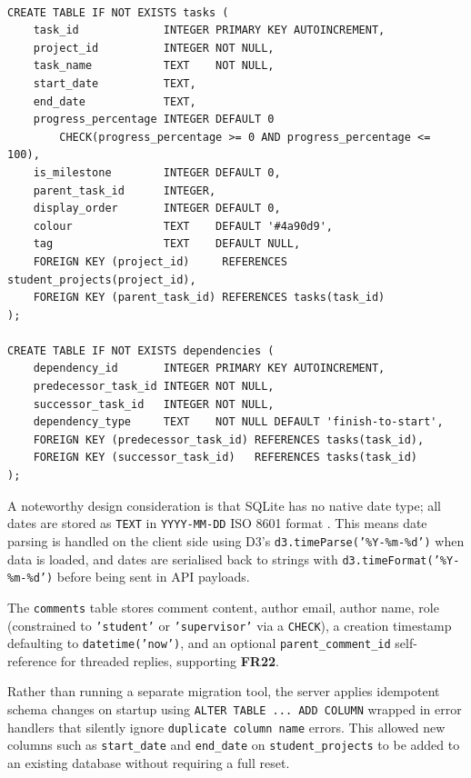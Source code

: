 \documentclass[12pt,nonacm,acmlarge,titlepage,screen]{acmart}
\begin{document}
\begin{lstlisting}[style=sqlstyle, caption={Core table definitions from setup.js}]
    
CREATE TABLE IF NOT EXISTS tasks (
    task_id             INTEGER PRIMARY KEY AUTOINCREMENT,
    project_id          INTEGER NOT NULL,
    task_name           TEXT    NOT NULL,
    start_date          TEXT,
    end_date            TEXT,   
    progress_percentage INTEGER DEFAULT 0
        CHECK(progress_percentage >= 0 AND progress_percentage <= 100),
    is_milestone        INTEGER DEFAULT 0,
    parent_task_id      INTEGER,
    display_order       INTEGER DEFAULT 0,
    colour              TEXT    DEFAULT '#4a90d9',
    tag                 TEXT    DEFAULT NULL,
    FOREIGN KEY (project_id)     REFERENCES student_projects(project_id),
    FOREIGN KEY (parent_task_id) REFERENCES tasks(task_id)
);

CREATE TABLE IF NOT EXISTS dependencies (
    dependency_id       INTEGER PRIMARY KEY AUTOINCREMENT,
    predecessor_task_id INTEGER NOT NULL,
    successor_task_id   INTEGER NOT NULL,
    dependency_type     TEXT    NOT NULL DEFAULT 'finish-to-start',
    FOREIGN KEY (predecessor_task_id) REFERENCES tasks(task_id),
    FOREIGN KEY (successor_task_id)   REFERENCES tasks(task_id)
);
\end{lstlisting}

A noteworthy design consideration is that SQLite has no native date type; all dates are stored
as \texttt{TEXT} in \texttt{YYYY-MM-DD} ISO 8601 format \cite{sqlite_datatypes}. This means date parsing is handled
on the client side using D3's \texttt{d3.timeParse('\%Y-\%m-\%d')} when data is loaded, and
dates are serialised back to strings with \texttt{d3.timeFormat('\%Y-\%m-\%d')} before being
sent in API payloads.

The \texttt{comments} table stores comment content, author email, author name, role (constrained
to \texttt{'student'} or \texttt{'supervisor'} via a \texttt{CHECK}), a creation timestamp
defaulting to \texttt{datetime('now')}, and an optional \texttt{parent\_comment\_id}
self-reference for threaded replies, supporting \textbf{FR22}\label{fr:22}.

Rather than running a separate migration tool, the server applies idempotent schema changes
on startup using \texttt{ALTER TABLE ... ADD COLUMN} wrapped in error handlers that silently
ignore \texttt{duplicate column name} errors. This allowed new columns such as
\texttt{start\_date} and \texttt{end\_date} on \texttt{student\_projects} to be added to an
existing database without requiring a full reset.
\end{document}
